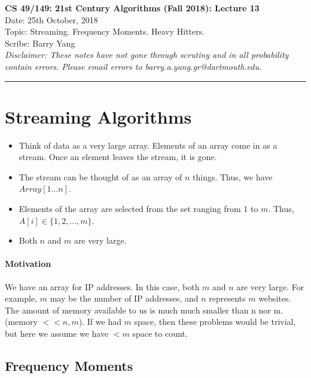\documentclass[11pt]{article}
\begin{document}
	\begin{center}
		{\bf \Large CS 49/149: 21st Century Algorithms (Fall 2018): Lecture 13}\\ 
		Date: 25th October, 2018 \\
		Topic: Streaming. Frequency Moments. Heavy Hitters. \\
		Scribe: Barry Yang \\
		{\em Disclaimer: These notes have not gone through scrutiny and in all probability contain errors. Please email errors to barry.a.yang.gr@dartmouth.edu.}
	\end{center}
\hrule height 2pt
\vspace{3ex}
\def\loss{\mathsf{loss}}
\section*{Streaming Algorithms}

\begin{itemize}

	\item Think of data as a very large array. Elements of an array come in as a stream. Once an element leaves the stream, it is gone.

	\item The stream can be thought of as an array of $n$ things. Thus, we have $Array[1...n]$.

	\item Elements of the array are selected from the set ranging from 1 to $m$. Thus, $A[i] \in \{1, 2, ... , m\}$.
	
	\item Both $n$ and $m$ are very large.

\end{itemize}

\paragraph{Motivation}

We have an array for IP addresses. In this case, both $m$ and $n$ are very large. For example, $m$ may be the number of IP addresses, and $n$ represents $m$ websites. The amount of memory available to us is much much smaller than n nor m. (memory $<< n, m$). If we had $m$ space, then these problems would be trivial, but here we assume we have $< m $ space to count.

\subsection*{Frequency Moments}
\end{document}
